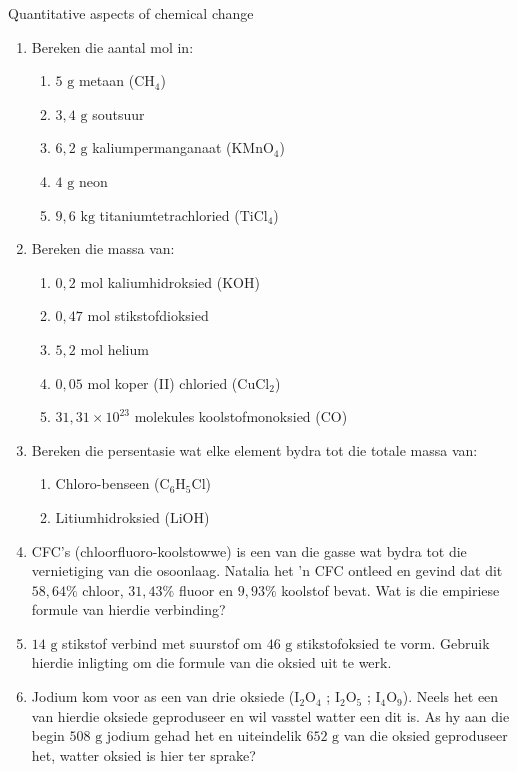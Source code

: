 \begin{eocexercises}{Quantitative aspects of chemical change}
\begin{enumerate}[noitemsep, label=\textbf{\arabic*}. ]
\item Bereken die aantal mol in:
 \begin{enumerate}[noitemsep, label=\textbf{\alph*}. ] 
 \item $5 \text{ g}$ metaan (${\text{CH}}_{4}$)
 \item $3,4 \text{ g}$ soutsuur
\item $6,2 \text{ g}$ kaliumpermanganaat (${\text{KMnO}}_{4}$)
 \item $4 \text{ g}$ neon
 \item $9,6 \text{ kg}$ titaniumtetrachloried (${\text{TiCl}}_{4}$)
 \end{enumerate}
\item Bereken die massa van:
 \begin{enumerate}[noitemsep, label=\textbf{\alph*}. ] 
 \item $0,2 \text{ mol}$ kaliumhidroksied ($\text{KOH}$)
 \item $0,47 \text{ mol}$ stikstofdioksied
 \item $5,2 \text{ mol}$ helium
 \item $0,05 \text{ mol}$ koper (II) chloried (${\text{CuCl}}_{2}$)
 \item $31,31 \times {10}^{23}$ molekules koolstofmonoksied ($\text{CO}$)\end{enumerate}
\item Bereken die persentasie wat elke element bydra tot die totale massa van:
 \begin{enumerate}[noitemsep, label=\textbf{\alph*}. ] 
 \item Chloro-benseen (${\text{C}}_{6}{\text{H}}_{5}\text{Cl}$)
 \item Litiumhidroksied ($\text{LiOH}$)
 \end{enumerate}
\item CFC's (chloorfluoro-koolstowwe) is een van die gasse wat bydra tot die vernietiging van die osoonlaag. Natalia het  'n CFC ontleed en gevind dat dit $58,64\%$ chloor, $31,43\%$ fluoor en $9,93\%$ koolstof bevat. Wat is die empiriese formule van hierdie verbinding?
\item $14 \text{ g}$ stikstof verbind met suurstof om $46 \text{ g}$ stikstofoksied te vorm. Gebruik hierdie inligting om die formule van die oksied uit te werk.
\item Jodium kom voor as een van drie oksiede (${\text{I}}_{2}{\text{O}}_{4}$ ; ${\text{I}}_{2}{\text{O}}_{5}$ ; ${\text{I}}_{4}{\text{O}}_{9}$). Neels het een van hierdie oksiede geproduseer en wil vasstel watter een dit is. As hy aan die begin $508 \text{ g}$ jodium gehad het en uiteindelik $652 \text{ g}$ van die oksied geproduseer het, watter oksied is hier ter sprake?

\end{enumerate}
\end{eocexercises}
